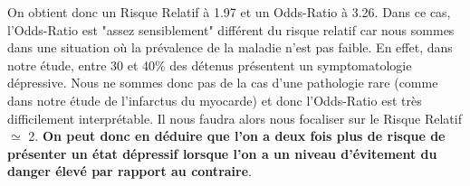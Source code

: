 On obtient donc un Risque Relatif à 1.97 et un Odds-Ratio à 3.26. \newline
Dans ce cas, l'Odds-Ratio est "assez sensiblement" différent du risque relatif car nous sommes dans une situation où la prévalence de la maladie n'est pas faible. En effet, dans notre étude, entre 30 et 40\% des détenus présentent un symptomatologie dépressive. Nous ne sommes donc pas de la cas d'une pathologie rare (comme dans notre étude de l'infarctus du myocarde) et donc l'Odds-Ratio est très difficilement interprétable.\newline
Il nous faudra alors nous focaliser sur le Risque Relatif  $\simeq$ 2.\newline 
\textbf{On peut donc en déduire que l'on a deux fois plus de risque de présenter un état dépressif lorsque l'on a un niveau d'évitement du danger élevé par rapport au contraire}.
\newpage 
